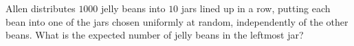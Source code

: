 Allen distributes $1000$ jelly beans into $10$ jars lined up in a row, putting each bean into one of the jars chosen uniformly at random, independently of the other beans. What is the expected number of jelly beans in the leftmost jar?
